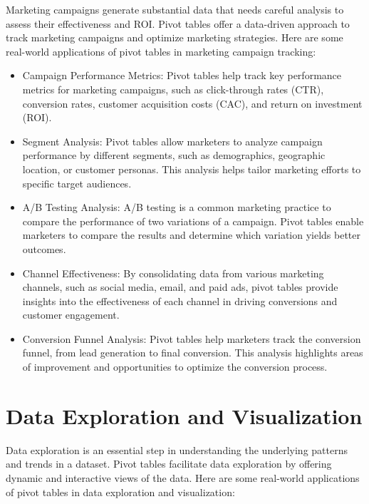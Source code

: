 \documentclass[
]{book}
\begin{document}
Marketing campaigns generate substantial data that needs careful analysis to assess their effectiveness and ROI. Pivot tables offer a data-driven approach to track marketing campaigns and optimize marketing strategies. Here are some real-world applications of pivot tables in marketing campaign tracking:

\begin{itemize}
\item
  Campaign Performance Metrics: Pivot tables help track key performance metrics for marketing campaigns, such as click-through rates (CTR), conversion rates, customer acquisition costs (CAC), and return on investment (ROI).
\item
  Segment Analysis: Pivot tables allow marketers to analyze campaign performance by different segments, such as demographics, geographic location, or customer personas. This analysis helps tailor marketing efforts to specific target audiences.
\item
  A/B Testing Analysis: A/B testing is a common marketing practice to compare the performance of two variations of a campaign. Pivot tables enable marketers to compare the results and determine which variation yields better outcomes.
\item
  Channel Effectiveness: By consolidating data from various marketing channels, such as social media, email, and paid ads, pivot tables provide insights into the effectiveness of each channel in driving conversions and customer engagement.
\item
  Conversion Funnel Analysis: Pivot tables help marketers track the conversion funnel, from lead generation to final conversion. This analysis highlights areas of improvement and opportunities to optimize the conversion process.
\end{itemize}

\hypertarget{data-exploration-and-visualization}{%
\section{Data Exploration and Visualization}\label{data-exploration-and-visualization}}

Data exploration is an essential step in understanding the underlying patterns and trends in a dataset. Pivot tables facilitate data exploration by offering dynamic and interactive views of the data. Here are some real-world applications of pivot tables in data exploration and visualization:
\end{document}
